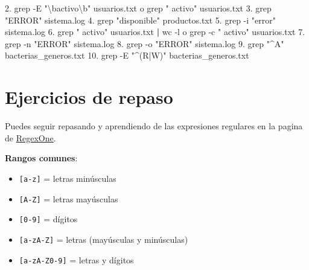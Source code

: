 \documentclass[
  spanish,
  12pt,
  letterpaper,
  DIV=11,
  numbers=noendperiod]{scrreprt}
\newenvironment{Shaded}{\begin{snugshade}}{\end{snugshade}}
\newcommand{\AttributeTok}[1]{\textcolor[rgb]{0.40,0.45,0.13}{#1}}
\newcommand{\ExtensionTok}[1]{\textcolor[rgb]{0.00,0.23,0.31}{#1}}
\newcommand{\FunctionTok}[1]{\textcolor[rgb]{0.28,0.35,0.67}{#1}}
\newcommand{\KeywordTok}[1]{\textcolor[rgb]{0.00,0.23,0.31}{\textbf{#1}}}
\newcommand{\NormalTok}[1]{\textcolor[rgb]{0.00,0.23,0.31}{#1}}
\newcommand{\StringTok}[1]{\textcolor[rgb]{0.13,0.47,0.30}{#1}}
\providecommand{\tightlist}{%
  \setlength{\itemsep}{0pt}\setlength{\parskip}{0pt}}
\begin{document}
\begin{enumerate}
\begin{tcolorbox}
\begin{Shaded}
\begin{Highlighting}[]
\ExtensionTok{2.}\NormalTok{ grep }\AttributeTok{{-}E} \StringTok{"\textbackslash{}bactivo\textbackslash{}b"}\NormalTok{ usuarios.txt o grep }\StringTok{" activo"}\NormalTok{ usuarios.txt}
\ExtensionTok{3.}\NormalTok{ grep }\StringTok{"ERROR"}\NormalTok{ sistema.log}
\ExtensionTok{4.}\NormalTok{ grep }\StringTok{"disponible"}\NormalTok{ productos.txt}
\ExtensionTok{5.}\NormalTok{ grep }\AttributeTok{{-}i} \StringTok{"error"}\NormalTok{ sistema.log}
\ExtensionTok{6.}\NormalTok{ grep }\StringTok{" activo"}\NormalTok{ usuarios.txt }\KeywordTok{|} \FunctionTok{wc} \AttributeTok{{-}l}\NormalTok{ o grep }\AttributeTok{{-}c} \StringTok{" activo"}\NormalTok{ usuarios.txt }
\ExtensionTok{7.}\NormalTok{ grep }\AttributeTok{{-}n} \StringTok{"ERROR"}\NormalTok{ sistema.log}
\ExtensionTok{8.}\NormalTok{ grep }\AttributeTok{{-}o} \StringTok{"ERROR"}\NormalTok{ sistema.log}
\ExtensionTok{9.}\NormalTok{ grep }\StringTok{"\^{}A"}\NormalTok{ bacterias\_generos.txt}
\ExtensionTok{10.}\NormalTok{ grep }\AttributeTok{{-}E} \StringTok{"\^{}(R|W)"}\NormalTok{ bacterias\_generos.txt}
\end{Highlighting}
\end{Shaded}

  \end{tcolorbox}
\end{enumerate}

\section{Ejercicios de repaso}\label{ejercicios-de-repaso}

Puedes seguir repasando y aprendiendo de las expresiones regulares en la
pagina de \href{https://regexone.com/}{RegexOne}.

\textbf{Rangos comunes}:

\begin{itemize}
\tightlist
\item
  \texttt{{[}a-z{]}} = letras minúsculas
\item
  \texttt{{[}A-Z{]}} = letras mayúsculas
\item
  \texttt{{[}0-9{]}} = dígitos
\item
  \texttt{{[}a-zA-Z{]}} = letras (mayúsculas y minúsculas)
\item
  \texttt{{[}a-zA-Z0-9{]}} = letras y dígitos
\end{itemize}
\end{document}
